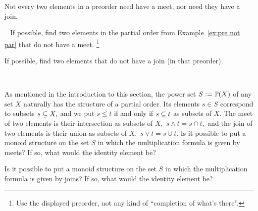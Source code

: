 \documentclass[../main/CT4S-EN-RU]{subfiles}
\begin{document}
\begin{exerciseRUS}
\end{exerciseRUS}

\begin{blockENG}
Not every two elements in a preorder need have a meet, nor need they have a join. 
\end{blockENG}

\begin{blockRUS}
\end{blockRUS}

\begin{exerciseENG}\label{exc:not all meets and joins}~
\sexc If possible, find two elements in the partial order from Example~\ref{ex:pre not par} that do not have a meet.
\footnote{Use the displayed preorder, not any kind of “completion of what's there”.} 
\item If possible, find two elements that do not have a join (in that preorder).
\endsexc
\end{exerciseENG}

\begin{exerciseRUS}\label{exc:not all meets and joins}~
\end{exerciseRUS}

\begin{exerciseENG}
As mentioned in the introduction to this section, the power set $S:=\PP(X)$ of any set $X$ naturally has the structure of a partial order. Its elements $s\in S$ correspond to subsets $s\ss X,$ and we put $s\leq t$ if and only if $s\ss t$ as subsets of $X.$ The meet of two elements is their intersection as subsets of $X,$ $s\wedge t= s\cap t,$ and the join of two elements is their union as subsets of $X,$ $s\vee t=s\cup t.$
\sexc Is it possible to put a monoid structure on the set $S$ in which the multiplication formula is given by meets? If so, what would the identity element be?
\item Is it possible to put a monoid structure on the set $S$ in which the multiplication formula is given by joins? If so, what would the identity element be?
\endsexc
\end{exerciseENG}

\begin{exerciseRUS}
\end{exerciseRUS}
\end{document}
